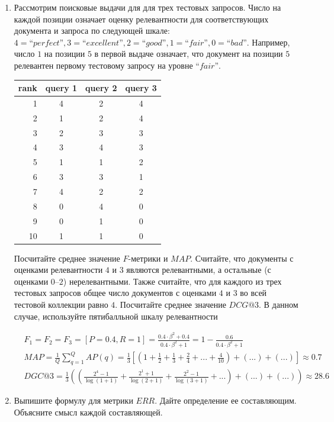 \begin{enumerate}
	\item Рассмотрим поисковые выдачи для для трех тестовых запросов. Число на каждой позиции 
	означает оценку релевантности для соответствующих документа и запроса по следующей шкале: 
	$4 = “perfect”, 3 = “excellent”, 2 = “good”, 1 = “fair”, 0 = “bad”$. Например, число $1$ 
	на позиции $5$ в первой выдаче означает, что документ на позиции $5$ релевантен первому 
	тестовому запросу на уровне $“fair”$.
	
	\begin{tabular}{ r | c | c | c }
		rank & query 1 & query 2 & query 3 \\
		\hline
		1 & 4 & 2 & 4  \\
		2 & 1 & 2 & 4  \\
		3 & 2 & 3 & 3  \\
		4 & 3 & 4 & 3  \\
		5 & 1 & 1 & 2  \\
		6 & 3 & 3 & 1  \\
		7 & 4 & 2 & 2  \\
		8 & 0 & 4 & 0  \\
		9 & 0 & 1 & 0  \\
		10 & 1 & 1 & 0 \\
	\end{tabular}
	
	Посчитайте среднее значение $F$-метрики и $MAP$. Считайте, что документы с оценками 
	релевантности $4$ и $3$ являются релевантными, а остальные (с оценками $0–2$)	
	нерелевантными. Также считайте, что для каждого из трех тестовых запросов общее число 
	документов с оценками $4$ и $3$ во всей тестовой коллекции равно $4$. Посчитайте среднее 
	значение $DCG@3$. В данном случае, используйте пятибалльной шкалу релевантности
	
	\begin{align*}
		&F_1 = F_2 = F_3 = [P = 0.4, R = 1] = \frac{0.4 \cdot \beta^2 + 0.4}{0.4\cdot \beta ^2 + 1} = 1 - \frac{0.6}{0.4 \cdot \beta^2 + 1} \\
		&MAP = \frac{1}{Q} \sum\limits_{q = 1}^{Q}AP(q) = \frac{1}{3} \left[(1 + \frac{1}{2} + \frac{1}{3} + \frac{2}{4} + ...+ \frac{4}{10}) + (...) + (...) \right] \approx 0.7 \\
		&DGC@3 = \frac{1}{3}((\frac{2^{4} - 1}{\log (1 + 1)} + \frac{2^1 + 1}{\log (2 + 1)} + \frac{2^2 - 1}{\log (3 + 1)} + ...) + (...) + (...)) \approx 28.6
	\end{align*}
	
	\item Выпишите формулу для метрики $ERR$. Дайте определение ее составляющим. Объясните 
	смысл каждой составляющей.
	

\end{enumerate}
